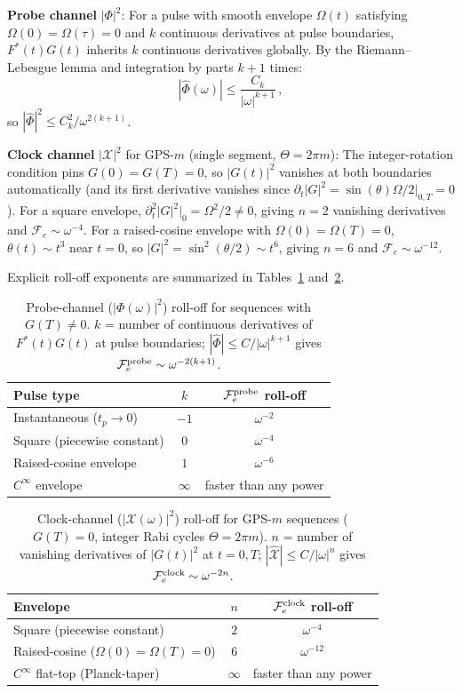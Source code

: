 \documentclass[aps,pra,twocolumn,superscriptaddress,longbibliography]{revtex4-2}
\newcommand{\be}{\begin{equation}}
\newcommand{\ee}{\end{equation}}
\begin{document}
\textbf{Probe channel} $|\Phi|^2$:
For a pulse with smooth envelope $\Omega(t)$ satisfying $\Omega(0)=\Omega(\tau)=0$
and $k$ continuous derivatives at pulse boundaries, $F^*(t)G(t)$ inherits $k$
continuous derivatives globally.
By the Riemann--Lebesgue lemma and integration by parts $k+1$ times:
\be
  |\hat\Phi(\omega)| \leq \frac{C_k}{|\omega|^{k+1}}\,,
\ee
so $|\hat\Phi|^2 \leq C_k^2/\omega^{2(k+1)}$.

\textbf{Clock channel} $|\mathcal{X}|^2$ for GPS-$m$ (single segment, $\Theta=2\pi m$):
The integer-rotation condition pins $G(0)=G(T)=0$, so $|G(t)|^2$ vanishes at both
boundaries automatically (and its first derivative vanishes since
$\partial_t|G|^2 = \sin(\theta)\Omega/2\big|_{0,T}=0$).
For a square envelope, $\partial_t^2|G|^2\big|_0 = \Omega^2/2 \neq 0$, giving $n=2$
vanishing derivatives and $\mathcal{F}_e\sim\omega^{-4}$.
For a raised-cosine envelope with $\Omega(0)=\Omega(T)=0$, $\theta(t)\sim t^3$ near
$t=0$, so $|G|^2=\sin^2(\theta/2)\sim t^6$, giving $n=6$ and $\mathcal{F}_e\sim\omega^{-12}$.

Explicit roll-off exponents are summarized in Tables~\ref{tab:rolloff_probe} and~\ref{tab:rolloff_clock}.

\begin{table}[h]
\caption{Probe-channel ($|\Phi(\omega)|^2$) roll-off for sequences with $G(T)\neq0$.
$k$ = number of continuous derivatives of $F^*(t)G(t)$ at pulse boundaries;
$|\hat\Phi|\leq C/|\omega|^{k+1}$ gives $\mathcal{F}_e^{\rm probe}\sim\omega^{-2(k+1)}$.}
\label{tab:rolloff_probe}
\centering
\begin{tabular}{lcc}
\hline
Pulse type & $k$ & $\mathcal{F}_e^{\rm probe}$ roll-off \\
\hline
Instantaneous ($t_p \to 0$) & $-1$ & $\omega^{-2}$ \\
Square (piecewise constant) & $0$  & $\omega^{-4}$ \\
Raised-cosine envelope      & $1$  & $\omega^{-6}$ \\
$C^\infty$ envelope         & $\infty$ & faster than any power \\
\hline
\end{tabular}
\end{table}

\begin{table}[h]
\caption{Clock-channel ($|\mathcal{X}(\omega)|^2$) roll-off for GPS-$m$ sequences ($G(T)=0$,
integer Rabi cycles $\Theta=2\pi m$).
$n$ = number of vanishing derivatives of $|G(t)|^2$ at $t=0,T$;
$|\hat{\mathcal{X}}|\leq C/|\omega|^n$ gives $\mathcal{F}_e^{\rm clock}\sim\omega^{-2n}$.}
\label{tab:rolloff_clock}
\centering
\begin{tabular}{lcc}
\hline
Envelope & $n$ & $\mathcal{F}_e^{\rm clock}$ roll-off \\
\hline
Square (piecewise constant) & $2$ & $\omega^{-4}$ \\
Raised-cosine ($\Omega(0)=\Omega(T)=0$) & $6$ & $\omega^{-12}$ \\
$C^\infty$ flat-top (Planck-taper) & $\infty$ & faster than any power \\
\hline
\end{tabular}
\end{table}
\end{document}
